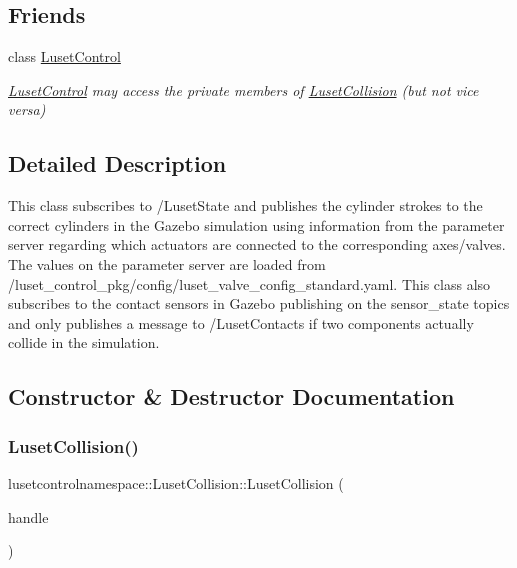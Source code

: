 \subsection*{Friends}
\begin{DoxyCompactItemize}
\item 
class \hyperlink{classlusetcontrolnamespace_1_1LusetCollision_a1a34ac10d34617ed2df4ec2e7d6c12a8}{Luset\+Control}
\begin{DoxyCompactList}\small\item\em \hyperlink{classlusetcontrolnamespace_1_1LusetControl}{Luset\+Control} may access the private members of \hyperlink{classlusetcontrolnamespace_1_1LusetCollision}{Luset\+Collision} (but not vice versa) \end{DoxyCompactList}\end{DoxyCompactItemize}


\subsection{Detailed Description}
This class subscribes to /\+Luset\+State and publishes the cylinder strokes to the correct cylinders in the Gazebo simulation using information from the parameter server regarding which actuators are connected to the corresponding axes/valves. The values on the parameter server are loaded from /luset\+\_\+control\+\_\+pkg/config/luset\+\_\+valve\+\_\+config\+\_\+standard.yaml. This class also subscribes to the contact sensors in Gazebo publishing on the sensor\+\_\+state topics and only publishes a message to /\+Luset\+Contacts if two components actually collide in the simulation. 

\subsection{Constructor \& Destructor Documentation}
\mbox{\label{classlusetcontrolnamespace_1_1LusetCollision_ad328e1562126f008d720283d46da46d1}} 
\subsubsection{\texorpdfstring{Luset\+Collision()}{LusetCollision()}}
{\footnotesize\ttfamily lusetcontrolnamespace\+::\+Luset\+Collision\+::\+Luset\+Collision (\begin{DoxyParamCaption}\item[{ros\+::\+Node\+Handle \&}]{handle }\end{DoxyParamCaption})}




